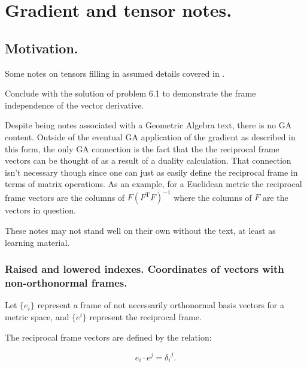 \chapter{Gradient and tensor notes.}
\label{chap:tensor}
\date{ June 6, 2008.  $RCSfile: tensor.tex,v $ Last $Revision: 1.15 $ $Date: 2009/06/14 17:59:59 $ }

\section{Motivation.}

Some notes on tensors filling in assumed details covered in 
\cite{doran2003gap}.


Conclude with the
solution of problem 6.1 to demonstrate the frame independence of the
vector derivative.

Despite being notes associated with a Geometric Algebra text, there is no
GA content.  Outside of the eventual GA application of the gradient as
described in this form, the only GA connection is the fact that the
the reciprocal frame vectors can be thought of as a result of a duality
calculation.  That connection isn't necessary though since one can just as
easily define the reciprocal frame in terms of matrix operations.  As an example, for a Euclidean metric the reciprocal frame vectors are the columns of
$F(F^\text{T}F)^{-1}$ where the columns of $F$ are the vectors in question.

These notes may not stand well on their own without the text, at least
as learning material.

\subsection{Raised and lowered indexes. Coordinates of vectors with non-orthonormal frames. }

Let $\{ e_i \}$ represent a frame of not necessarily orthonormal basis vectors for a metric space, and $\{ e^i \}$ represent the reciprocal frame.

The reciprocal frame vectors are defined by the relation:

\begin{equation}
e_i \cdot e^j = {\delta_i}^j.
\end{equation}

